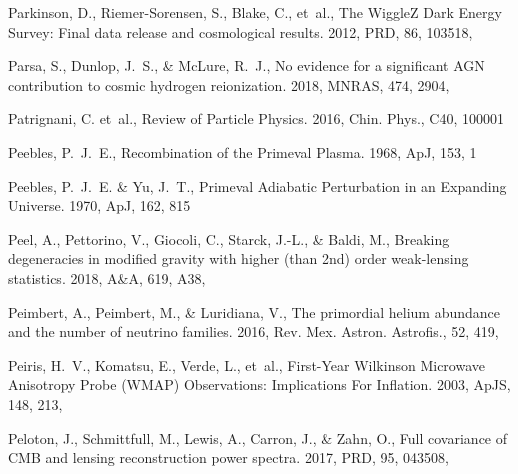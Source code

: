 \documentclass[longauth,traditabstract]{aa}
\def\aap{{A\&A}}
\def\apj{{ApJ}}
\def\mnras{{MNRAS}}
\def\apjs{{ApJS}}
\def\prd{{PRD}}
\begin{document}
\begin{thebibliography}{379}
Parkinson, D., Riemer-Sorensen, S., Blake, C., {et~al.}, {The WiggleZ Dark
  Energy Survey: Final data release and cosmological results}. 2012, \prd, 86,
  103518, 

Parsa, S., Dunlop, J.~S., \& McLure, R.~J., {No evidence for a significant AGN
  contribution to cosmic hydrogen reionization}. 2018, \mnras, 474, 2904,

Patrignani, C. {et~al.}, {Review of Particle Physics}. 2016, Chin. Phys., C40,
  100001

{Peebles}, P.~J.~E., {Recombination of the Primeval Plasma}. 1968, \apj, 153, 1

{Peebles}, P.~J.~E. \& {Yu}, J.~T., {Primeval Adiabatic Perturbation in an
  Expanding Universe}. 1970, \apj, 162, 815

Peel, A., Pettorino, V., Giocoli, C., Starck, J.-L., \& Baldi, M., {Breaking
  degeneracies in modified gravity with higher (than 2nd) order weak-lensing
  statistics}. 2018, \aap, 619, A38, 

Peimbert, A., Peimbert, M., \& Luridiana, V., {The primordial helium abundance
  and the number of neutrino families}. 2016, Rev. Mex. Astron. Astrofis., 52,
  419, 

{Peiris}, H.~V., {Komatsu}, E., {Verde}, L., {et~al.}, {First-Year Wilkinson
  Microwave Anisotropy Probe (WMAP) Observations: Implications For Inflation}.
  2003, \apjs, 148, 213, 

Peloton, J., Schmittfull, M., Lewis, A., Carron, J., \& Zahn, O., {Full
  covariance of CMB and lensing reconstruction power spectra}. 2017, \prd, 95,
  043508, 


\end{thebibliography}
\end{document}
